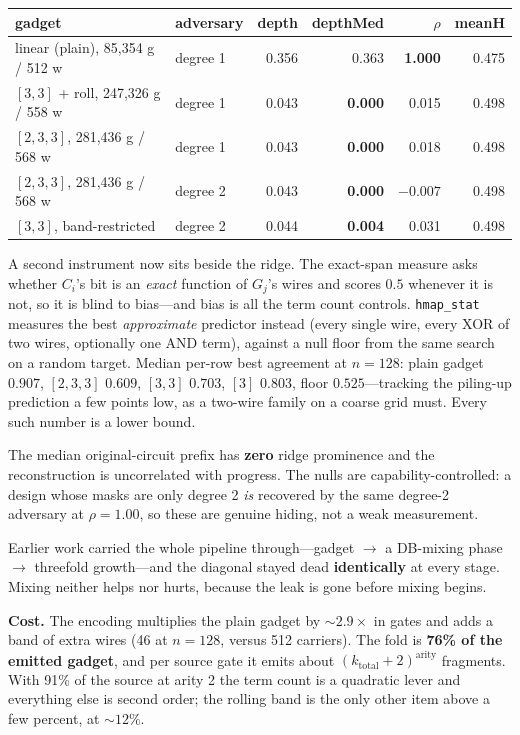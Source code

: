 \documentclass[11pt]{article}
\begin{document}
\begin{center}
\begin{tabular}{llrrrr}
\toprule
gadget & adversary & depth & depthMed & $\rho$ & meanH \\
\midrule
linear (plain), 85{,}354 g / 512 w & degree 1 & 0.356 & 0.363 & \textbf{1.000} & 0.475 \\
$[3,3]$ + roll, 247{,}326 g / 558 w & degree 1 & 0.043 & \textbf{0.000} & 0.015 & 0.498 \\
$[2,3,3]$, 281{,}436 g / 568 w & degree 1 & 0.043 & \textbf{0.000} & 0.018 & 0.498 \\
$[2,3,3]$, 281{,}436 g / 568 w & degree 2 & 0.043 & \textbf{0.000} & $-0.007$ & 0.498 \\
$[3,3]$, band-restricted & degree 2 & 0.044 & \textbf{0.004} & 0.031 & 0.498 \\
\bottomrule
\end{tabular}
\end{center}

A second instrument now sits beside the ridge. The exact-span measure asks
whether $C_i$'s bit is an \emph{exact} function of $G_j$'s wires and scores
$0.5$ whenever it is not, so it is blind to bias---and bias is all the term
count controls. \texttt{hmap\_stat} measures the best \emph{approximate}
predictor instead (every single wire, every XOR of two wires, optionally one
AND term), against a null floor from the same search on a random target. Median
per-row best agreement at $n{=}128$: plain gadget $0.907$, $[2,3,3]$ $0.609$,
$[3,3]$ $0.703$, $[3]$ $0.803$, floor $0.525$---tracking the piling-up
prediction a few points low, as a two-wire family on a coarse grid must. Every
such number is a lower bound.

The median original-circuit prefix has \textbf{zero} ridge prominence and the
reconstruction is uncorrelated with progress. The nulls are
capability-controlled: a design whose masks are only degree 2 \emph{is} recovered
by the same degree-2 adversary at $\rho=1.00$, so these are genuine hiding, not
a weak measurement.

Earlier work carried the whole pipeline through---gadget $\to$ a DB-mixing phase
$\to$ threefold growth---and the diagonal stayed dead \textbf{identically} at
every stage. Mixing neither helps nor hurts, because the leak is gone before
mixing begins.

\textbf{Cost.} The encoding multiplies the plain gadget by ${\sim}2.9\times$ in
gates and adds a band of extra wires (46 at $n{=}128$, versus 512 carriers). The
fold is \textbf{76\% of the emitted gadget}, and per source gate it emits about
$(k_{\mathrm{total}}+2)^{\mathrm{arity}}$ fragments. With 91\% of the source at
arity 2 the term count is a quadratic lever and everything else is second order;
the rolling band is the only other item above a few percent, at ${\sim}12\%$.
\end{document}
